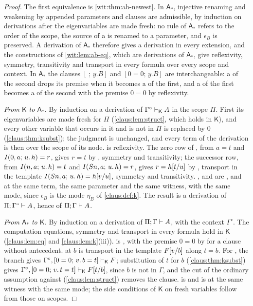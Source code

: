\begin{proof}
The first equivalence is \cref{wit:thm:ab-newest}.  In $\mathsf{A}_{\ast}$,
injective renaming and weakening by appended parameters and clauses are
admissible, by induction on derivations after the eigenvariables are made
fresh: no rule of $\mathsf{A}_{\ast}$ refers to the order of the scope, the
source of a  is renamed to a parameter, and $\epsilon_B$ is
preserved.  A derivation of $\mathsf{A}_{\ast}$ therefore gives a
derivation in every extension, and the constructions of
\cref{wit:lem:ab-eq}, which are derivations of $\mathsf{A}_{\ast}$, give
reflexivity, symmetry, transitivity and transport in every formula over
every scope and context.  In $\mathsf{A}_{\ast}$ the clauses $[\ ;\,y.B]$
and $[0=0;\,y.B]$ are interchangeable: a  of the second drops
its premise when it becomes a  of the first, and a
 of the first becomes a  of the second with the
premise $0=0$ by reflexivity.

\emph{From $\mathsf{K}$ to $\mathsf{A}_{\ast}$.}  By induction on a
derivation of $\Gamma^{\circ}\vdash_{\mathsf{K}}A$ in the scope $\Pi$.
First its eigenvariables are made fresh for $\Pi$
(\cref{claus:lem:struct}, which holds in $\mathsf{K}$), and every other
variable that occurs in it and is not in $\Pi$ is replaced by $0$
(\cref{claus:thm:ksubst}); the judgment is unchanged, and every term of the
derivation is then over the scope of its node.
 is reflexivity.  The zero row of , from
$a=t$ and $I(0,a;\,u.\,h)=r$, gives $r=t$ by , symmetry and
transitivity; the successor row, from $I(n,a;\,u.\,h)=t$ and
$I(S n,a;\,u.\,h)=r$, gives $r=h[t/u]$ by ,
transport in the template $I(S n,a;\,u.\,h)=h[v/u]$, symmetry and
transitivity.  ,  and  are
,  and  at the same term, the
same parameter and the same witness, with the same mode, since
$\epsilon_B$ is the mode $\eta_B$ of \cref{claus:def:k}.  The result is a
derivation of $\Pi;\Gamma^{\circ}\vdash A$, hence of $\Pi;\Gamma\vdash A$.

\emph{From $\mathsf{A}_{\ast}$ to $\mathsf{K}$.}  By induction on a
derivation of $\Pi;\Gamma\vdash A$, with the context $\Gamma^{\circ}$.  The
computation equations, symmetry and transport in every formula hold in
$\mathsf{K}$ (\cref{claus:lem:eq} and \cref{claus:lem:k}(iii)).
 is , with the premise $0=0$ by 
for a clause without antecedent.   at $b$ is transport in
the template $F[v/b]$ along $t=b$.  For , the branch
gives $\Gamma^{\circ},[0=0;\,v.\,b=t]\vdash_{\mathsf{K}}F$; substitution of
$t$ for $b$ (\cref{claus:thm:ksubst}) gives
$\Gamma^{\circ},[0=0;\,v.\,t=t]\vdash_{\mathsf{K}}F[t/b]$, since $b$
is not in $\Gamma$, and the cut of the ordinary assumption against
 (\cref{claus:lem:struct}) removes the clause.
 is  and  is 
at the same witness with the same mode; the side conditions of $\mathsf{K}$
on fresh variables follow from those on scopes.


\end{proof}
